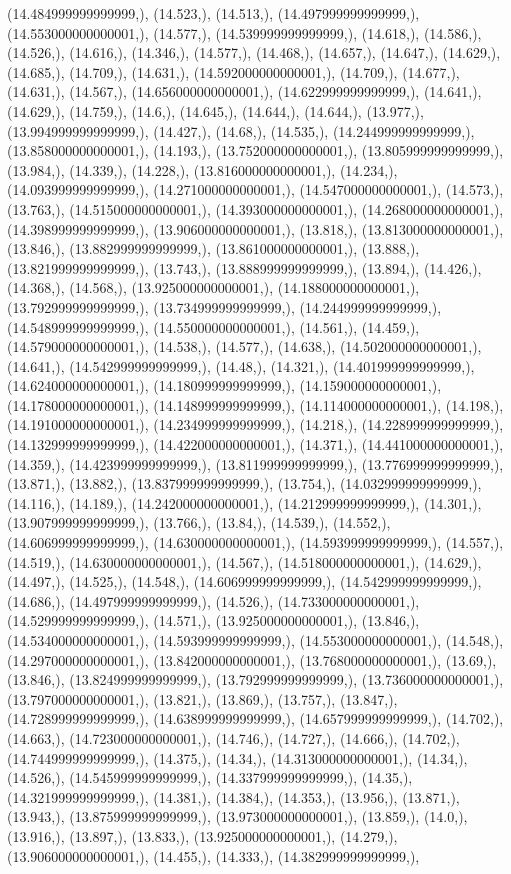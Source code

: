 \documentclass{article}
\begin{document}
(14.484999999999999,), (14.523,), (14.513,), (14.497999999999999,), (14.553000000000001,), (14.577,), (14.539999999999999,), (14.618,), (14.586,), (14.526,), (14.616,), (14.346,), (14.577,), (14.468,), (14.657,), (14.647,), (14.629,), (14.685,), (14.709,), (14.631,), (14.592000000000001,), (14.709,), (14.677,), (14.631,), (14.567,), (14.656000000000001,), (14.622999999999999,), (14.641,), (14.629,), (14.759,), (14.6,), (14.645,), (14.644,), (14.644,), (13.977,), (13.994999999999999,), (14.427,), (14.68,), (14.535,), (14.244999999999999,), (13.858000000000001,), (14.193,), (13.752000000000001,), (13.805999999999999,), (13.984,), (14.339,), (14.228,), (13.816000000000001,), (14.234,), (14.093999999999999,), (14.271000000000001,), (14.547000000000001,), (14.573,), (13.763,), (14.515000000000001,), (14.393000000000001,), (14.268000000000001,), (14.398999999999999,), (13.906000000000001,), (13.818,), (13.813000000000001,), (13.846,), (13.882999999999999,), (13.861000000000001,), (13.888,), (13.821999999999999,), (13.743,), (13.888999999999999,), (13.894,), (14.426,), (14.368,), (14.568,), (13.925000000000001,), (14.188000000000001,), (13.792999999999999,), (13.734999999999999,), (14.244999999999999,), (14.548999999999999,), (14.550000000000001,), (14.561,), (14.459,), (14.579000000000001,), (14.538,), (14.577,), (14.638,), (14.502000000000001,), (14.641,), (14.542999999999999,), (14.48,), (14.321,), (14.401999999999999,), (14.624000000000001,), (14.180999999999999,), (14.159000000000001,), (14.178000000000001,), (14.148999999999999,), (14.114000000000001,), (14.198,), (14.191000000000001,), (14.234999999999999,), (14.218,), (14.228999999999999,), (14.132999999999999,), (14.422000000000001,), (14.371,), (14.441000000000001,), (14.359,), (14.423999999999999,), (13.811999999999999,), (13.776999999999999,), (13.871,), (13.882,), (13.837999999999999,), (13.754,), (14.032999999999999,), (14.116,), (14.189,), (14.242000000000001,), (14.212999999999999,), (14.301,), (13.907999999999999,), (13.766,), (13.84,), (14.539,), (14.552,), (14.606999999999999,), (14.630000000000001,), (14.593999999999999,), (14.557,), (14.519,), (14.630000000000001,), (14.567,), (14.518000000000001,), (14.629,), (14.497,), (14.525,), (14.548,), (14.606999999999999,), (14.542999999999999,), (14.686,), (14.497999999999999,), (14.526,), (14.733000000000001,), (14.529999999999999,), (14.571,), (13.925000000000001,), (13.846,), (14.534000000000001,), (14.593999999999999,), (14.553000000000001,), (14.548,), (14.297000000000001,), (13.842000000000001,), (13.768000000000001,), (13.69,), (13.846,), (13.824999999999999,), (13.792999999999999,), (13.736000000000001,), (13.797000000000001,), (13.821,), (13.869,), (13.757,), (13.847,), (14.728999999999999,), (14.638999999999999,), (14.657999999999999,), (14.702,), (14.663,), (14.723000000000001,), (14.746,), (14.727,), (14.666,), (14.702,), (14.744999999999999,), (14.375,), (14.34,), (14.313000000000001,), (14.34,), (14.526,), (14.545999999999999,), (14.337999999999999,), (14.35,), (14.321999999999999,), (14.381,), (14.384,), (14.353,), (13.956,), (13.871,), (13.943,), (13.875999999999999,), (13.973000000000001,), (13.859,), (14.0,), (13.916,), (13.897,), (13.833,), (13.925000000000001,), (14.279,), (13.906000000000001,), (14.455,), (14.333,), (14.382999999999999,), 
\end{document}
